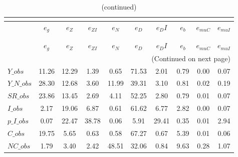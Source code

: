  
\begin{center}
\begin{longtable}{lccccccccc} 
\caption{VARIANCE DECOMPOSITION (in percent)}\\
 \label{Table:th_var_decomp_uncond}\\
\toprule 
$               $	 & 	 $        {e_g}$	 & 	 $        {e_Z}$	 & 	 $     {e_{ZI}}$	 & 	 $        {e_N}$	 & 	 $        {e_D}$	 & 	 $       {e_DI}$	 & 	 $        {e_b}$	 & 	 $    {e_{muC}}$	 & 	 $    {e_{muI}}$\\
\midrule \endfirsthead 
\caption{(continued)}\\
 \toprule \\ 
$               $	 & 	 $        {e_g}$	 & 	 $        {e_Z}$	 & 	 $     {e_{ZI}}$	 & 	 $        {e_N}$	 & 	 $        {e_D}$	 & 	 $       {e_DI}$	 & 	 $        {e_b}$	 & 	 $    {e_{muC}}$	 & 	 $    {e_{muI}}$\\
\midrule \endhead 
\midrule \multicolumn{10}{r}{(Continued on next page)} \\ \bottomrule \endfoot 
\bottomrule \endlastfoot 
$Y\_obs         $	 & 	        11.26	 & 	        12.29	 & 	         1.39	 & 	         0.65	 & 	        71.53	 & 	         2.01	 & 	         0.79	 & 	         0.00	 & 	         0.07 \\ 
$Y\_N\_obs      $	 & 	        28.30	 & 	        12.68	 & 	         3.60	 & 	        11.99	 & 	        39.31	 & 	         3.10	 & 	         0.81	 & 	         0.02	 & 	         0.19 \\ 
$SR\_obs        $	 & 	        23.86	 & 	        13.45	 & 	         2.69	 & 	         4.11	 & 	        52.25	 & 	         2.80	 & 	         0.79	 & 	         0.01	 & 	         0.07 \\ 
$I\_obs         $	 & 	         2.17	 & 	        19.06	 & 	         6.87	 & 	         0.61	 & 	        61.62	 & 	         6.77	 & 	         2.82	 & 	         0.00	 & 	         0.07 \\ 
$p\_I\_obs      $	 & 	         0.07	 & 	        22.47	 & 	        38.78	 & 	         0.06	 & 	         5.91	 & 	        29.41	 & 	         0.35	 & 	         0.01	 & 	         2.94 \\ 
$C\_obs         $	 & 	        19.75	 & 	         5.65	 & 	         0.63	 & 	         0.58	 & 	        67.27	 & 	         0.67	 & 	         5.39	 & 	         0.01	 & 	         0.06 \\ 
$NC\_obs        $	 & 	         1.79	 & 	         3.40	 & 	         2.42	 & 	        48.51	 & 	        32.06	 & 	         0.84	 & 	         9.63	 & 	         0.28	 & 	         1.07 \\ 

\end{longtable}
\end{center}
